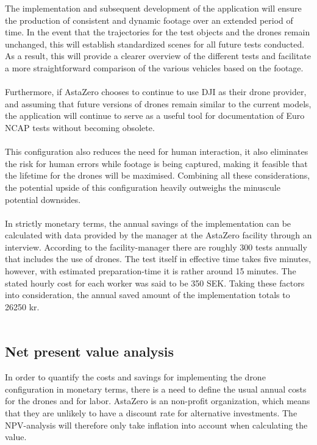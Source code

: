 The implementation and subsequent development of the application will ensure the production of consistent and dynamic footage over an extended period of time. In the event that the trajectories for the test objects and the drones remain unchanged, this will establish standardized scenes for all future tests conducted. As a result, this will provide a clearer overview of the different tests and facilitate a more straightforward comparison of the various vehicles based on the footage.
\\ \\
Furthermore, if AstaZero chooses to continue to use DJI as their drone provider, and assuming that future versions of drones remain similar to the current models, the application will continue to serve as a useful tool for documentation of Euro NCAP tests without becoming obsolete. 
\\ \\
This configuration also reduces the need for human interaction, it also eliminates the risk for human errors while footage is being captured, making it feasible that the lifetime for the drones will be maximised. Combining all these considerations, the potential upside of this configuration heavily outweighs the minuscule potential downsides. 
\\ \\
In strictly monetary terms, the annual savings of the implementation can be calculated with data provided by the manager at the AstaZero facility through an interview. According to the facility-manager there are roughly 300 tests annually that includes the use of drones. The test itself in effective time takes five minutes, however, with estimated preparation-time it is rather around 15 minutes. The stated hourly cost for each worker was said to be 350 SEK. Taking these factors into consideration, the annual saved amount of the implementation totals to 26250 kr.
\\ \\
\subsection{Net present value analysis}
In order to quantify the costs and savings for implementing the drone configuration in monetary terms, there is a need to define the usual annual costs for the drones and for labor. AstaZero is an non-profit organization, which means that they are unlikely to have a discount rate for alternative investments. The NPV-analysis will therefore only take inflation into account when calculating the value. 
\\

